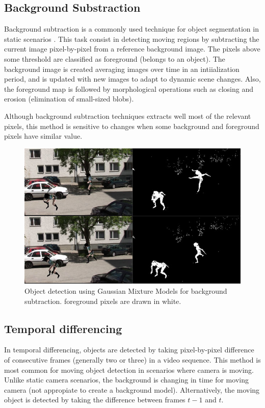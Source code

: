 \subsection{Background Substraction}

Background subtraction is a commonly used technique for object segmentation in static scenarios \cite{McIvor2000}. This task consist in detecting moving regions by subtracting the current image pixel-by-pixel from a reference background image. The pixels above some threshold are classified as foreground (belongs to an object). The background image is created averaging images over time in an intiialization period, and is updated with new images to adapt to dynamic scene changes. Also, the foreground map is followed by morphological operations such as closing and erosion (elimination of small-sized blobs).

Although background subtraction techniques extracts well most of the relevant pixels, this method is sensitive to changes when some background and foreground pixels have similar value.

\begin{figure}[h!]
	\centering
		\includegraphics[width=0.7\linewidth]{Figures/bg_sub.jpg}
	\caption{Object detection using Gaussian Mixture Models for background subtraction. foreground pixels are drawn in white.}
	\label{fig::bg_sub}
\end{figure}

\subsection{Temporal differencing}

In temporal differencing, objects are detected by taking pixel-by-pixel difference of consecutive frames (generally two or three) in a video sequence. This method is most common for moving object detection in scenarios where camera is moving. Unlike static camera scenarios, the background is changing in time for moving camera (not appropiate to create a background model). Alternatively, the moving object is detected by taking the difference between frames $t - 1$ and $t$.

